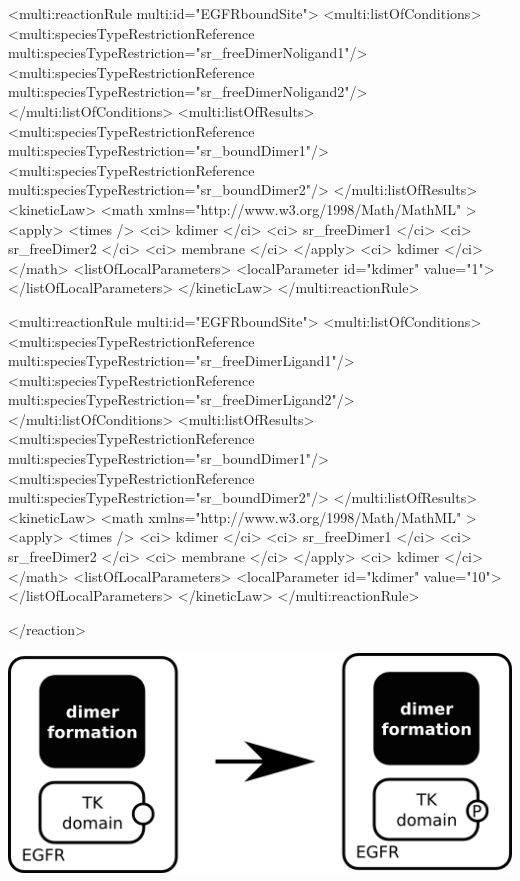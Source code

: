 \begin{example}
        <multi:reactionRule multi:id="EGFRboundSite">
          <multi:listOfConditions>
            <multi:speciesTypeRestrictionReference multi:speciesTypeRestriction="sr_freeDimerNoligand1"/>
            <multi:speciesTypeRestrictionReference multi:speciesTypeRestriction="sr_freeDimerNoligand2"/>
          </multi:listOfConditions>
          <multi:listOfResults>
            <multi:speciesTypeRestrictionReference multi:speciesTypeRestriction="sr_boundDimer1"/>
            <multi:speciesTypeRestrictionReference multi:speciesTypeRestriction="sr_boundDimer2"/>
          </multi:listOfResults>
            <kineticLaw>
              <math xmlns="http://www.w3.org/1998/Math/MathML" >
                <apply>
                  <times />
                  <ci> kdimer </ci>
                  <ci> sr_freeDimer1 </ci>
                  <ci> sr_freeDimer2 </ci>
                  <ci> membrane </ci>
                </apply>
                <ci> kdimer </ci>
              </math>
              <listOfLocalParameters>
                <localParameter id="kdimer" value="1">
              </listOfLocalParameters>
            </kineticLaw>
          </multi:reactionRule>

        <multi:reactionRule multi:id="EGFRboundSite">
          <multi:listOfConditions>
            <multi:speciesTypeRestrictionReference multi:speciesTypeRestriction="sr_freeDimerLigand1"/>
            <multi:speciesTypeRestrictionReference multi:speciesTypeRestriction="sr_freeDimerLigand2"/>
          </multi:listOfConditions>
          <multi:listOfResults>
            <multi:speciesTypeRestrictionReference multi:speciesTypeRestriction="sr_boundDimer1"/>
            <multi:speciesTypeRestrictionReference multi:speciesTypeRestriction="sr_boundDimer2"/>
          </multi:listOfResults>
            <kineticLaw>
              <math xmlns="http://www.w3.org/1998/Math/MathML" >
                <apply>
                  <times />
                  <ci> kdimer </ci>
                  <ci> sr_freeDimer1 </ci>
                  <ci> sr_freeDimer2 </ci>
                  <ci> membrane </ci>
                </apply>
                <ci> kdimer </ci>
              </math>
              <listOfLocalParameters>
                <localParameter id="kdimer" value="10">
              </listOfLocalParameters>
            </kineticLaw>
          </multi:reactionRule>

      </reaction>
\end{example}

\includegraphics[scale=0.9]{figs/pngs/phosphorylation.png}

